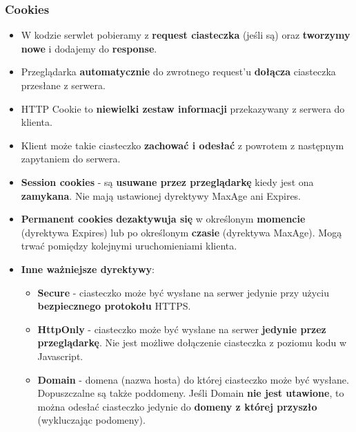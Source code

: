 \documentclass[../main.tex]{subfiles}
\begin{document}
    \subsubsection{Cookies}
    \begin{itemize}
        \item W kodzie serwlet pobieramy z \textbf{request ciasteczka} (jeśli są) oraz \textbf{tworzymy nowe} i dodajemy do \textbf{response}.
        \item Przeglądarka \textbf{automatycznie} do zwrotnego request'u \textbf{dołącza} ciasteczka
        przesłane z serwera.
        \item HTTP Cookie to \textbf{niewielki zestaw informacji} przekazywany z serwera do klienta.
        \item Klient może takie ciasteczko \textbf{zachować i odesłać} z powrotem z następnym
        zapytaniem do serwera.
        \item \textbf{Session cookies} - są \textbf{usuwane przez przeglądarkę} kiedy jest ona \textbf{zamykana}. Nie mają
        ustawionej dyrektywy MaxAge ani Expires.
        \item \textbf{Permanent cookies} \textbf{dezaktywuja się} w określonym \textbf{momencie} (dyrektywa Expires) lub po
        określonym \textbf{czasie} (dyrektywa MaxAge). Mogą trwać pomiędzy kolejnymi uruchomieniami klienta.\\

        \item \textbf{Inne ważniejsze dyrektywy}:
        \begin{itemize}
            \item \textbf{Secure} - ciasteczko może być wysłane na serwer jedynie przy użyciu \textbf{bezpiecznego
            protokołu} HTTPS.
            \item \textbf{HttpOnly} - ciasteczko może być wysłane na serwer \textbf{jedynie przez przeglądarkę}. Nie jest
            możliwe dołączenie ciasteczka z poziomu kodu w Javascript.
            \item \textbf{Domain} - domena (nazwa hosta) do której ciasteczko może być wysłane.
            Dopuszczalne są także poddomeny. Jeśli Domain \textbf{nie jest utawione}, to można odesłać ciasteczko jedynie do
            \textbf{domeny z której przyszło} (wykluczając podomeny).
        \end{itemize}
    \end{itemize}
\end{document}
